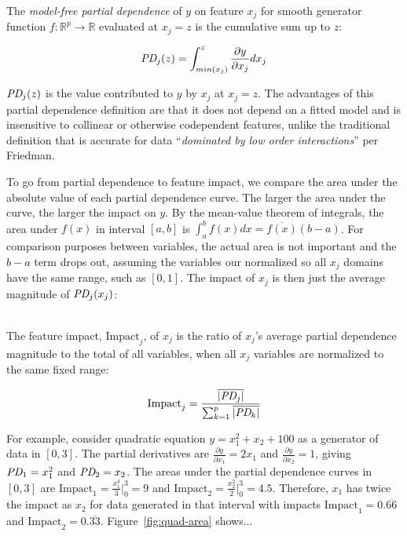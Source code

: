 \documentclass[11pt]{article}
\newcommand{\figref}[1]{Figure~\ref{#1}}
\newcommand{\todo}[1]{{{\color{red}{[#1]}}}}
\newcommand{\Imp}{\text{Impact}}
\begin{document}
~\\
 The {\em model-free partial dependence} of $y$ on feature $x_j$ for smooth generator function $f:\mathbb{R}^{p} \rightarrow \mathbb{R}$ evaluated at $x_j = z$ is the cumulative sum up to $z$:

\begin{equation}\label{eq:pd}
\text{\it PD}_j(z) = \int_{min(x_j)}^z \frac{\partial y}{\partial x_j} dx_j
\end{equation}

$\text{\it PD}_j(z)$ is the value contributed to $y$ by $x_j$ at $x_j = z$. The advantages of this partial dependence definition are that it does not depend on a fitted model and is insensitive to collinear or otherwise codependent features, unlike the traditional definition that is accurate for data ``{\em dominated by low order interactions}'' per Friedman.  

\todo{sum should be $\overline{y}$}

To go from partial dependence to feature impact, we compare the area under the absolute value of each partial dependence curve. The larger the area under the curve, the larger the impact on $y$.   By the mean-value theorem of integrals, the area under $f(x)$ in interval $[a,b]$ is $\int_{a}^{b} f(x) dx = \overline{f(x)}(b-a)$.  For comparison purposes between variables, the actual area is not important and the $b-a$ term drops out, assuming the variables our normalized so all $x_j$ domains have the same range, such as $[0,1]$. The impact of $x_j$ is then just the average magnitude of $\text{\it PD}_j(x_j)$:

~\\
 The feature impact, $\Imp_j$, of $x_j$ is the ratio of $x_j$'s average partial dependence magnitude to the total of all variables, when all $x_j$ variables are normalized to the same fixed range:

\begin{equation}\label{eq:Epd2a}
\Imp_j = \frac{\overline{|\text{\it PD}_j|}}{\sum_{k=1}^p \overline{|\text{\it PD}_k|}}
\end{equation}

\noindent For example, consider quadratic equation $y = x_1^2 + x_2 + 100$ as a generator of data in $[0,3]$. The partial derivatives are $\frac{\partial y}{\partial x_1} = 2 x_1$ and $\frac{\partial y}{\partial x_2} = 1$, giving $\text{\it PD}_1 = x_1^2$ and $\text{\it PD}_2 = x_2$. The areas under the partial dependence curves in $[0,3]$ are $\Imp_1 = \frac{x_1^3}{3} \big |_0^3 = 9$ and $\Imp_2 = \frac{x_2^2}{2} \big |_0^3 = 4.5$.   Therefore, $x_1$ has twice the impact as $x_2$ for data generated in that interval with impacts $\Imp_1 = 0.\overline{66}$ and $\Imp_2 = 0.\overline{33}$. \figref{fig:quad-area} shows...
\end{document}
